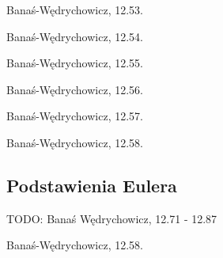 \begin{problem}
    Banaś-Wędrychowicz, 12.53.
\end{problem}

\begin{problem}
    Banaś-Wędrychowicz, 12.54.
\end{problem}

\begin{problem}
    Banaś-Wędrychowicz, 12.55.
\end{problem}

\begin{problem}
    Banaś-Wędrychowicz, 12.56.
\end{problem}

\begin{problem}
    Banaś-Wędrychowicz, 12.57.
\end{problem}

\begin{problem}
    Banaś-Wędrychowicz, 12.58.
\end{problem}

\subsection{Podstawienia Eulera}

TODO: Banaś Wędrychowicz, 12.71 - 12.87

\begin{problem}
    Banaś-Wędrychowicz, 12.58.
\end{problem}

%
